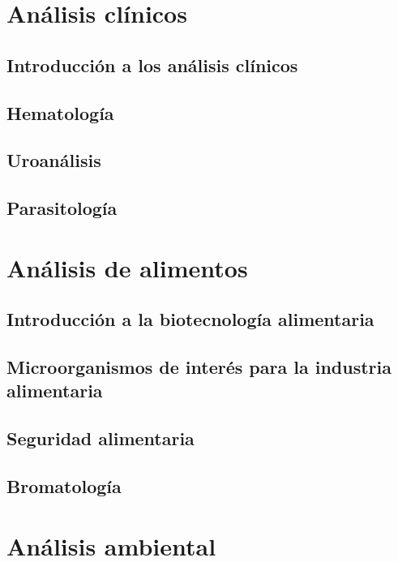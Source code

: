 \documentclass{AsignaturaResumen}
\begin{document}
    \frontmatter
    
\Portada
\Indices

    \mainmatter
    

\part{Análisis clínicos}

    \chapter{Introducción a los análisis clínicos} 
    \chapter{Hematología} 
    \chapter{Uroanálisis} 
    \chapter{Parasitología} 

\part{Análisis de alimentos}

    \chapter{Introducción a la biotecnología alimentaria} 
    \chapter{Microorganismos de interés para la industria alimentaria} 
    \chapter{Seguridad alimentaria} 
    \chapter{Bromatología} 

\part{Análisis ambiental}
\end{document}
